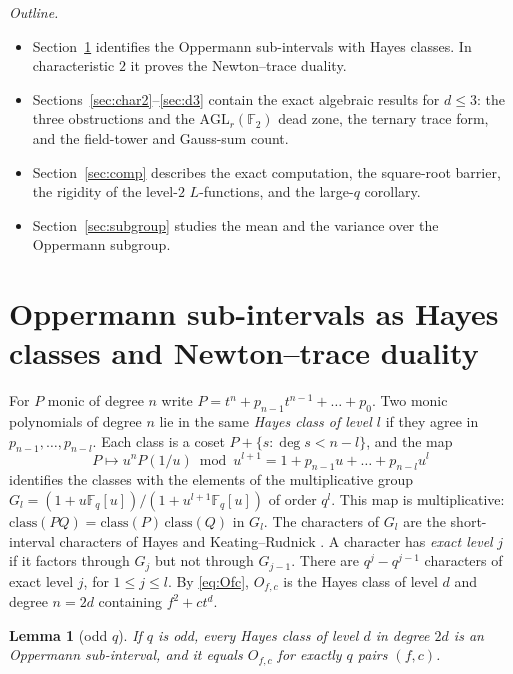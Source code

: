 \documentclass[11pt,a4paper]{amsart}
\newtheorem{lemma}[theorem]{Lemma}
\theoremstyle{definition}
\theoremstyle{remark}
\newcommand{\F}{\mathbb{F}}
\newcommand{\AGL}{\mathrm{AGL}}
\begin{document}
\emph{Outline.}
\begin{itemize}
\item Section~\ref{sec:classes} identifies the Oppermann sub-intervals with Hayes classes. In characteristic $2$ it
proves the Newton--trace duality.
\item Sections~\ref{sec:char2}--\ref{sec:d3} contain the exact algebraic results for $d\le3$: the three obstructions
and the $\AGL_r(\F_2)$ dead zone, the ternary trace form, and the field-tower and Gauss-sum count.
\item Section~\ref{sec:comp} describes the exact computation, the square-root barrier, the rigidity of the level-$2$
$L$-functions, and the large-$q$ corollary.
\item Section~\ref{sec:subgroup} studies the mean and the variance over the Oppermann subgroup.
\end{itemize}


\section{Oppermann sub-intervals as Hayes classes and Newton--trace duality}\label{sec:classes}

For $P$ monic of degree $n$ write $P=t^n+p_{n-1}t^{n-1}+\dots+p_0$. Two monic polynomials of degree $n$ lie in the
same \emph{Hayes class of level $l$} if they agree in $p_{n-1},\dots,p_{n-l}$. Each class is a coset
$P+\{s:\deg s<n-l\}$, and the map
\[
P\mapsto u^nP(1/u)\bmod u^{l+1}=1+p_{n-1}u+\dots+p_{n-l}u^l
\]
identifies the classes with the elements of the multiplicative group $G_l=(1+u\F_q[u])/(1+u^{l+1}\F_q[u])$ of order
$q^l$. This map is multiplicative: $\mathrm{class}(PQ)=\mathrm{class}(P)\,\mathrm{class}(Q)$ in $G_l$. The characters
of $G_l$ are the short-interval characters of Hayes \cite{Hayes} and Keating--Rudnick \cite{KR}. A character has
\emph{exact level} $j$ if it factors through $G_j$ but not through $G_{j-1}$. There are $q^j-q^{j-1}$ characters of
exact level $j$, for $1\le j\le l$. By
\eqref{eq:Ofc}, $O_{f,c}$ is the Hayes class of level $d$ and degree $n=2d$ containing $f^2+ct^d$.

\begin{lemma}[odd $q$]\label{lem:odd}
If $q$ is odd, every Hayes class of level $d$ in degree $2d$ is an Oppermann sub-interval, and it equals $O_{f,c}$ for
exactly $q$ pairs $(f,c)$.
\end{lemma}
\end{document}

